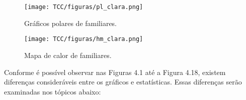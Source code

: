\begin{enumerate}
    \begin{figure}[H]
        \centering
        \texttt{[image: TCC/figuras/pl\_clara.png]}
        \caption{Gráficos polares de familiares.}
        \label{pl-familia}
    \end{figure}
    
    \begin{figure}[H]
        \centering
        \texttt{[image: TCC/figuras/hm\_clara.png]}
        \caption{Mapa de calor de familiares.}
        \label{hm-familia}
    \end{figure}
\end{enumerate}

Conforme é possível observar nas Figuras 4.1 até a Figura 4.18, existem diferenças consideráveis entre os gráficos e estatísticas. Essas diferenças serão examinadas nos tópicos abaixo:

